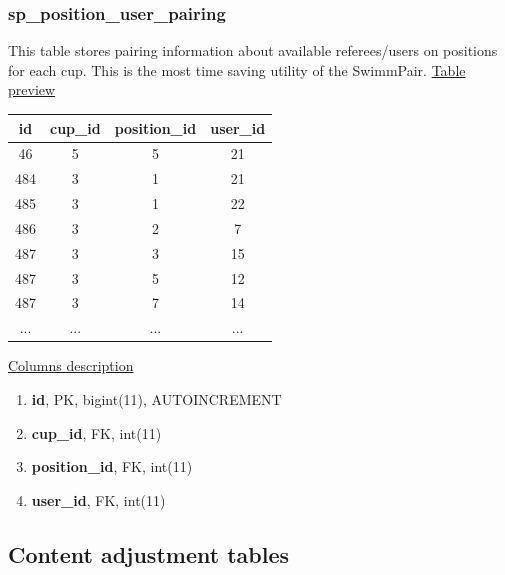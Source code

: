 \subsubsection*{sp\_position\_user\_pairing}
This table stores pairing information about available referees/users on positions for each cup. This is the most time saving utility of the SwimmPair.
\newline
\underline{Table preview}
\begin{center}
 \begin{tabular}{||c c c c||} 
 \hline
 id & cup\_id & position\_id & user\_id  \\ [0.5ex] 
 \hline\hline
 46 & 5 & 5 & 21 \\ 
 \hline
 484 & 3 & 1 & 21 \\ 
 \hline
 485 & 3 & 1 & 22 \\ 
 \hline
 486 & 3 & 2 & 7 \\
 \hline
 487 & 3 & 3 & 15 \\
 \hline
 487 & 3 & 5 & 12 \\
 \hline
 487 & 3 & 7 & 14 \\
 \hline
 ... & ... & ... & ... \\ [0.5ex] 
 \hline
\end{tabular}
\end{center}
\underline{Columns description}
\begin{enumerate}
  \setlength\itemsep{0em}
  \item \textbf{id}, PK, bigint(11), AUTOINCREMENT
  \item \textbf{cup\_id}, FK, int(11)
  \item \textbf{position\_id}, FK, int(11)
  \item \textbf{user\_id}, FK, int(11)
\end{enumerate}
\subsection{Content adjustment tables}
